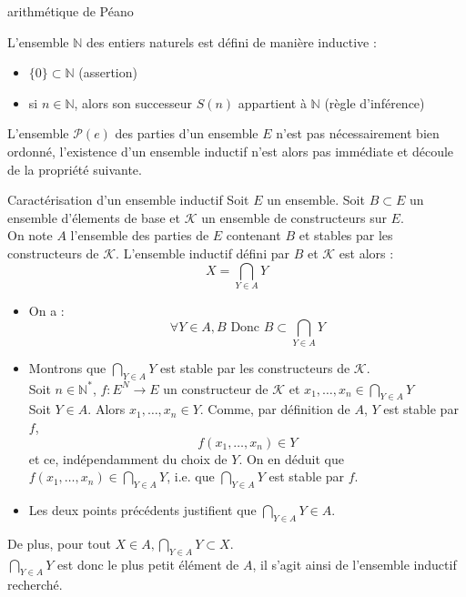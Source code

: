         \begin{exemple}{6.38}{arithmétique de Péano}
            \item L'ensemble $\mathbb{N}$ des entiers naturels est défini de manière inductive :\begin{itemize}
                \item $\{0\} \subset \mathbb{N}$ (assertion)
                \item si $n \in \mathbb{N}$, alors son successeur $S(n)$ appartient à $\mathbb{N}$ (règle d'inférence)
            \end{itemize}
        \end{exemple}

        \begin{remarque}{6.39}{}
            \item L'ensemble $\mathcal{P}(e)$ des parties d'un ensemble $E$ n'est pas nécessairement bien ordonné, l'existence d'un ensemble inductif n'est alors pas immédiate et découle de la propriété suivante.       
        \end{remarque}

        \begin{proposition}{6.40}{Caractérisation d'un ensemble inductif}
            Soit $E$ un ensemble. Soit $B \subset E$ un ensemble d'élements de base et $\mathcal{K}$ un ensemble de constructeurs sur $E$. \\ On note $A$ l'ensemble des parties de $E$ contenant $B$ et stables par les constructeurs de $\mathcal{K}$. L'ensemble inductif défini par $B$ et $\mathcal{K}$ est alors : $$X = \bigcap_{Y \in A}Y$$
        \end{proposition}

        \begin{demonstration}
            \begin{itemize}
                \item On a : $$\forall Y \in A, B \text{ Donc } B \subset \bigcap_{Y \in A} Y$$ 
                \item Montrons que $\bigcap_{Y \in A} Y$ est stable par les constructeurs de $\mathcal{K}$. \\ Soit $n \in \mathbb{N}^*$, $f:E^N \rightarrow E$ un constructeur de $\mathcal{K}$ et $x_1, \ldots, x_n \in \bigcap_{Y \in A} Y$ \\ Soit $Y \in A$. Alors $x_1, \ldots, x_n \in Y$. Comme, par définition de $A$, $Y$ est stable par $f$, $$f(x_1, \ldots, x_n) \in Y$$ et ce, indépendamment du choix de $Y$. On en déduit que $f(x_1, \ldots, x_n) \in \bigcap_{Y \in A} Y$, i.e. que $\bigcap_{Y \in A} Y$ est stable par $f$. 
                \item Les deux points précédents justifient que $\bigcap_{Y \in A} Y \in A$.
            \end{itemize}
            De plus, pour tout $X \in A, \bigcap_{Y \in A} Y \subset X$. \\ $\bigcap_{Y \in A} Y$ est donc le plus petit élément de $A$, il s'agit ainsi de l'ensemble inductif recherché.
        \end{demonstration}

